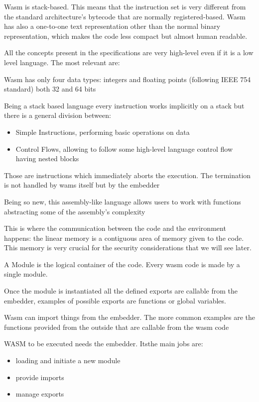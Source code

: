 \documentclass[../main.tex]{subfiles}
\begin{document}
Wasm is stack-based. This means that the instruction set is very different from the standard architecture's bytecode that are normally registered-based. Wasm has also a one-to-one text representation other than the normal binary representation, which makes the code less compact but almost human readable.

All the concepts present in the specifications are very high-level even if it is a low level language. The most relevant are:

\begin{description}[font=$\bullet$ \scshape\bfseries]
  \item[Values]
        Wasm has only four data types: integers and floating points (following IEEE 754 standard) both 32 and 64 bits
  \item[Instructions]
        Being a stack based language every instruction works implicitly on a stack but there is a general division between:
        \begin{itemize}
          \item Simple Instructions, performing basic operations on data
          \item Control Flows, allowing to follow some high-level language control flow having nested blocks
        \end{itemize}
  \item[Traps]
        Those are instructions which immediately aborts the execution. The termination is not handled by wams itself but by the embedder
  \item[Functions]
        Being so new, this assembly-like language allows users to work with functions abstracting some of the assembly's complexity
  \item[Linear Memory]
        This is where the communication between the code and the environment happens: the linear memory is a contiguous area of memory given to the code. This memory is very crucial for the security considerations that we will see later.
  \item[Modules]
        A Module is the logical container of the code. Every wasm code is made by a single module.
  \item[Exports] Once the module is instantiated all the defined exports are callable from the embedder, examples of possible exports are functions or global variables.
  \item[Imports] Wasm can import things from the embedder. The more common examples are the functions provided from the outside that are callable from the wasm code
  \item[Embedder]
        WASM to be executed needs the embedder. Itsthe main jobs are:
        \begin{itemize}
          \item loading and initiate a new module
          \item provide imports
          \item manage exports
        \end{itemize}
\end{description}
\end{document}
